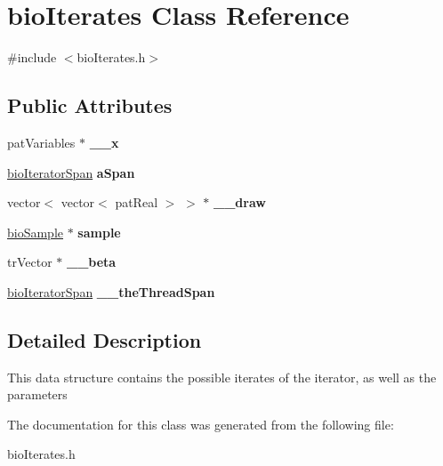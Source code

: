 \hypertarget{classbio_iterates}{}\section{bio\+Iterates Class Reference}
\label{classbio_iterates}


{\ttfamily \#include $<$bio\+Iterates.\+h$>$}

\subsection*{Public Attributes}
\begin{DoxyCompactItemize}
\item 
\mbox{\label{classbio_iterates_a0413bcbf2c01de0022bec730af81c55d}} 
pat\+Variables $\ast$ {\bfseries \+\_\+\+\_\+x}
\item 
\mbox{\label{classbio_iterates_a964b76bf9df93e7f16a86b56889b355b}} 
\hyperlink{classbio_iterator_span}{bio\+Iterator\+Span} {\bfseries a\+Span}
\item 
\mbox{\label{classbio_iterates_aec6124fcacd772a3c19fd0ee9cb19b4c}} 
vector$<$ vector$<$ pat\+Real $>$ $>$ $\ast$ {\bfseries \+\_\+\+\_\+draw}
\item 
\mbox{\label{classbio_iterates_acab01d51db675d16a0e712b7965aeea8}} 
\hyperlink{classbio_sample}{bio\+Sample} $\ast$ {\bfseries sample}
\item 
\mbox{\label{classbio_iterates_a6058407b47b20d7d307900484c01e188}} 
tr\+Vector $\ast$ {\bfseries \+\_\+\+\_\+beta}
\item 
\mbox{\label{classbio_iterates_a8761ce5aca65483f7c5a14fc3e277026}} 
\hyperlink{classbio_iterator_span}{bio\+Iterator\+Span} {\bfseries \+\_\+\+\_\+the\+Thread\+Span}
\end{DoxyCompactItemize}


\subsection{Detailed Description}
This data structure contains the possible iterates of the iterator, as well as the parameters 

The documentation for this class was generated from the following file\+:\begin{DoxyCompactItemize}
\item 
bio\+Iterates.\+h\end{DoxyCompactItemize}
